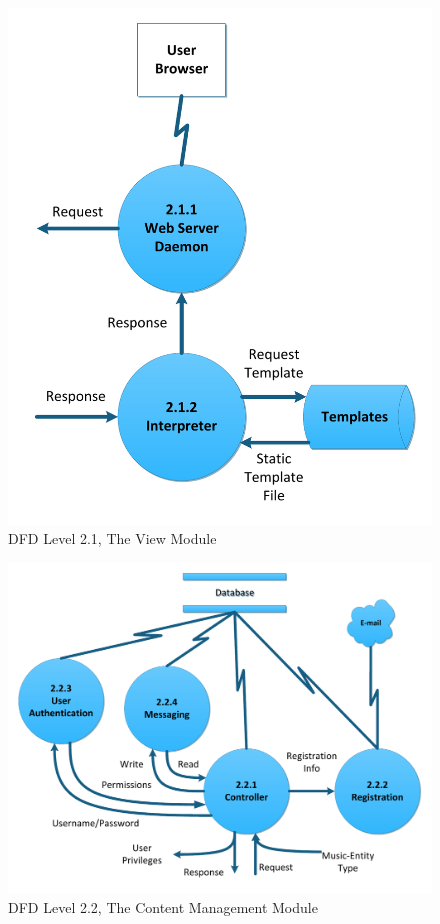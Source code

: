 \documentclass[letterpaper,12pt]{article}
\begin{document}
{\begin{figure}[h!]
\centering
\includegraphics[scale=0.6]{DFD_level_2_1.pdf}
\caption{DFD Level 2.1, The View Module}
\label{fig:DFD_level_2.1, The View Module}
\end{figure}

\eject

\begin{figure}[h]
\centering
\includegraphics[scale=0.6]{DFD_level_2_2.pdf}
\caption{DFD Level 2.2, The Content Management Module}
\label{fig:DFD_level_2.2, The Content Management Module}
\end{figure}

}
\end{document}

